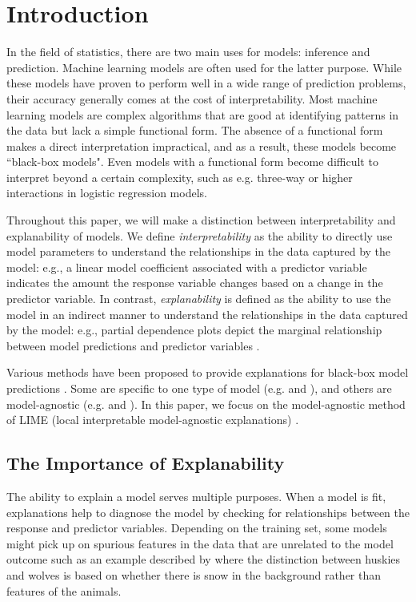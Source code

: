 \documentclass[AMS,STIX2COL]{WileyNJD-v2}\usepackage[]{graphicx}\usepackage[]{color}
\begin{document}
\section{Introduction}

In the field of statistics, there are two main uses for models: inference and prediction. Machine learning models are often used for the latter purpose. While these models have proven to perform well in a wide range of prediction problems, their accuracy generally comes at the cost of interpretability. Most machine learning models are complex algorithms that are good at identifying patterns in the data but lack a simple functional form. The absence of a functional form makes a direct interpretation impractical, and as a result, these models become ``black-box models". Even models with a functional form become difficult to interpret beyond a certain complexity, such as e.g. three-way or higher interactions in logistic regression models.

Throughout this paper, we will make a distinction between interpretability and explanability of models. We define {\it interpretability} as the ability to directly use model parameters to understand the relationships in the data captured by the model: e.g., a linear model coefficient associated with a predictor variable indicates the amount the response variable changes based on a change in the predictor variable. In contrast, {\it explanability} is defined as the ability to use the model in an indirect manner to understand the relationships in the data captured by the model: e.g., partial dependence plots depict the marginal relationship between model predictions and predictor variables \citep{friedman:2001}.

Various methods have been proposed to provide explanations for black-box model predictions \citep{guidotti:2018, mohseni:2018, molnar:2019}. Some are specific to one type of model (e.g. \citep{bau:2017} and \citep{hara:2016}), and others are model-agnostic (e.g. \citep{greenwell:2018} and \citep{strumbelj:2014}). In this paper, we focus on the model-agnostic method of LIME (local interpretable model-agnostic explanations) \citep{ribeiro:2016}.

\subsection{The Importance of Explanability}

The ability to explain a model serves multiple purposes. When a model is fit, explanations help to diagnose the model by checking for relationships between the response and predictor variables. Depending on the training set, some models might pick up on spurious features in the data that are unrelated to the model outcome such as an example described by \citet{ribeiro:2016} where the distinction between huskies and wolves is based on whether there is snow in the background rather than features of the animals.
\end{document}
